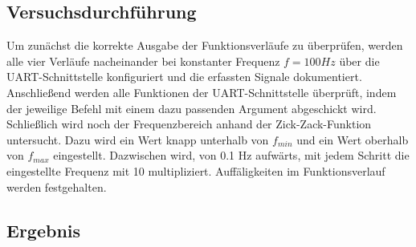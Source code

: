 \subsection{Versuchsdurchführung}
Um zunächst die korrekte Ausgabe der Funktionsverläufe zu überprüfen, werden alle vier Verläufe nacheinander bei konstanter Frequenz $f=100Hz$ über die UART-Schnittstelle konfiguriert und die erfassten Signale dokumentiert.
Anschließend werden alle Funktionen der UART-Schnittstelle überprüft, indem der jeweilige Befehl mit einem dazu passenden Argument abgeschickt wird.
Schließlich wird noch der Frequenzbereich anhand der Zick-Zack-Funktion untersucht.
Dazu wird ein Wert knapp unterhalb von $f_{min}$ und ein Wert oberhalb von $f_{max}$ eingestellt.
Dazwischen wird, von 0.1 Hz aufwärts, mit jedem Schritt die eingestellte Frequenz mit 10 multipliziert.
Auffäligkeiten im Funktionsverlauf werden festgehalten.

\subsection{Ergebnis}

